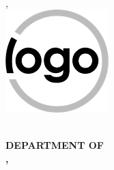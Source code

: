 \begin{center}
{{{{\InternalSupervisorDept{}\\
\InstituteNameShort{}, \InstituteCity{}} }}}
\\\vspace{25pt}
\includegraphics[width=0.3\textwidth]{assets/logo.png}
\vspace{10pt}\\
\normalsize \Year{}\\\vspace{5pt}

\large \textbf{DEPARTMENT OF \MakeUppercase{\Subject}\\\vspace{2pt}
\MakeUppercase{\InstituteName{}}, \MakeUppercase{\InstituteCity{}}}
\end{center}
\normalsize
\setcounter{page}{0}
\newpage